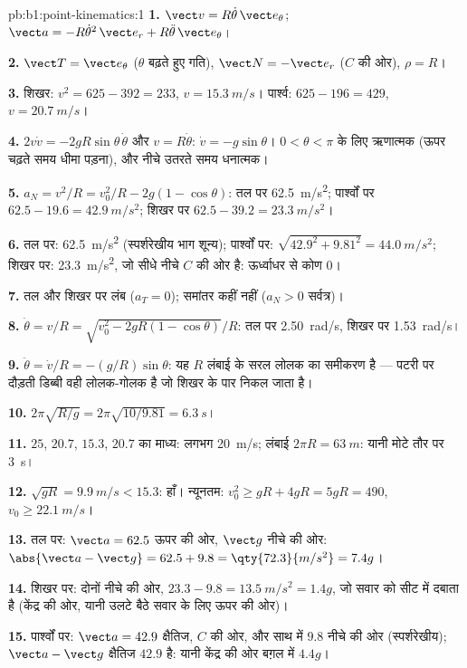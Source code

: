 \begin{solution}{pb:b1:point-kinematics:1}
\textbf{1.} $\vect v = R\dot\theta\,\vect e_\theta$; $\vect a = -R\dot\theta^2
\,\vect e_r + R\ddot\theta\,\vect e_\theta$।

\textbf{2.} $\vect T = \vect e_\theta$ ($\theta$ बढ़ते हुए गति),
$\vect N = -\vect e_r$ ($C$ की ओर), $\rho = R$।

\textbf{3.} शिखर: $v^2 = 625 - 392 = 233$, $v = \qty{15.3}{m/s}$। पार्श्व:
$625 - 196 = 429$, $v = \qty{20.7}{m/s}$।

\textbf{4.} $2v\dot v = -2gR\sin\theta\,\dot\theta$ और $v = R\dot\theta$:
$\dot v = -g\sin\theta$। $0 < \theta < \pi$ के लिए ऋणात्मक (ऊपर चढ़ते समय
धीमा पड़ना), और नीचे उतरते समय धनात्मक।

\textbf{5.} $a_N = v^2/R = v_0^2/R - 2g(1 - \cos\theta)$: तल पर
\qty{62.5}{m/s^2}; पार्श्वों पर $62.5 - 19.6 = \qty{42.9}{m/s^2}$; शिखर पर $62.5 -
39.2 = \qty{23.3}{m/s^2}$।

\textbf{6.} तल पर: \qty{62.5}{m/s^2} (स्पर्शरेखीय भाग शून्य); पार्श्वों पर:
$\sqrt{42.9^2 + 9.81^2} = \qty{44.0}{m/s^2}$; शिखर पर: \qty{23.3}{m/s^2},
जो सीधे नीचे $C$ की ओर है: ऊर्ध्वाधर से कोण $0$।

\textbf{7.} तल और शिखर पर लंब ($a_T = 0$); समांतर कहीं नहीं
($a_N > 0$ सर्वत्र)।

\textbf{8.} $\dot\theta = v/R = \sqrt{v_0^2 - 2gR(1 - \cos\theta)}/R$:
तल पर \qty{2.50}{rad/s}, शिखर पर \qty{1.53}{rad/s}।

\textbf{9.} $\ddot\theta = \dot v/R = -(g/R)\sin\theta$: यह $R$ लंबाई के
सरल लोलक का समीकरण है --- पटरी पर दौड़ती डिब्बी वही लोलक-गोलक है जो शिखर के
पार निकल जाता है।

\textbf{10.} $2\pi\sqrt{R/g} = 2\pi\sqrt{10/9.81} = \qty{6.3}{s}$।

\textbf{11.} $25$, $20.7$, $15.3$, $20.7$ का माध्य: लगभग \qty{20}{m/s};
लंबाई $2\pi R = \qty{63}{m}$: यानी मोटे तौर पर \qty{3}{s}।

\textbf{12.} $\sqrt{gR} = \qty{9.9}{m/s} < 15.3$: हाँ। न्यूनतम: $v_0^2 \geq
gR + 4gR = 5gR = 490$, $v_0 \geq \qty{22.1}{m/s}$।

\textbf{13.} तल पर: $\vect a = 62.5$ ऊपर की ओर, $\vect g$ नीचे की ओर:
$\abs{\vect a - \vect g} = 62.5 + 9.8 = \qty{72.3}{m/s^2} = 7.4g$।

\textbf{14.} शिखर पर: दोनों नीचे की ओर, $23.3 - 9.8 = \qty{13.5}{m/s^2} = 1.4g$,
जो सवार को सीट में दबाता है (केंद्र की ओर, यानी उलटे बैठे सवार के लिए ऊपर
की ओर)।

\textbf{15.} पार्श्वों पर: $\vect a = 42.9$ क्षैतिज, $C$ की ओर, और साथ में
$9.8$ नीचे की ओर (स्पर्शरेखीय); $\vect a - \vect g$ क्षैतिज $42.9$ है: यानी
केंद्र की ओर बग़ल में $4.4g$।


\end{solution}
